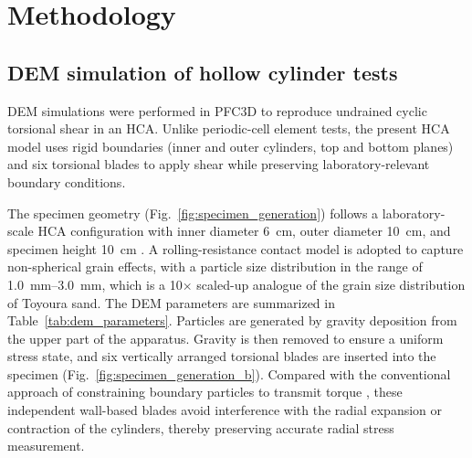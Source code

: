 \section{Methodology}
\label{sec:methodology}

\subsection{DEM simulation of hollow cylinder tests}
\label{subsec:dem_hca}

DEM simulations were performed in \textsc{PFC3D} \citep{Itasca2021} to reproduce undrained cyclic torsional shear in an HCA. Unlike periodic-cell element tests, the present HCA model uses rigid boundaries (inner and outer cylinders, top and bottom planes) and six torsional blades to apply shear while preserving laboratory-relevant boundary conditions.

The specimen geometry (Fig.~\ref{fig:specimen_generation}) follows a laboratory-scale HCA configuration with inner diameter \SI{6}{cm}, outer diameter \SI{10}{cm}, and specimen height \SI{10}{cm} \citep{Vargas2020}. A rolling-resistance contact model \citep{IwashitaOda1998,WensrichKatterfeld2012} is adopted to capture non-spherical grain effects, with a particle size distribution in the range of \SIrange{1.0}{3.0}{mm}, which is a 10$\times$ scaled-up analogue of the grain size distribution of Toyoura sand. The DEM parameters are summarized in Table~\ref{tab:dem_parameters}. Particles are generated by gravity deposition from the upper part of the apparatus. Gravity is then removed to ensure a uniform stress state, and six vertically arranged torsional blades are inserted into the specimen (Fig.~\ref{fig:specimen_generation_b}). Compared with the conventional approach of constraining boundary particles to transmit torque \citep[e.g.,][]{Li2014,Liu2021}, these independent wall-based blades avoid interference with the radial expansion or contraction of the cylinders, thereby preserving accurate radial stress measurement.

